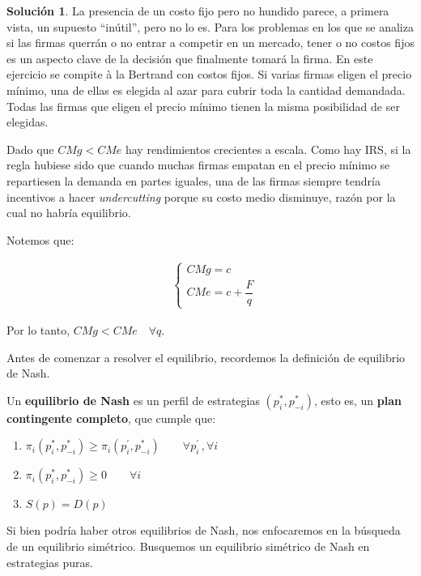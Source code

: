 \documentclass[a4paper, 11pt]{article}
\theoremstyle{definition}
\newtheorem{solucion}{Soluci\'on}
\begin{document}
\begin{solucion} %
La presencia de un costo fijo pero no hundido parece, a primera vista, un supuesto ``inútil'', pero no lo es. Para los problemas en los que se analiza si las firmas querrán o no entrar a competir en un mercado, tener o no costos fijos es un aspecto clave de la decisión que finalmente tomará la firma. En este ejercicio se compite à la Bertrand con costos fijos. Si varias firmas eligen el precio mínimo, una de ellas es elegida al azar para cubrir toda la cantidad demandada. Todas las firmas que eligen el precio mínimo tienen la misma posibilidad de ser elegidas.

Dado que $CMg < CMe$ hay rendimientos crecientes a escala. Como hay IRS, si la regla hubiese sido que cuando muchas firmas empatan en el precio mínimo se repartiesen la demanda en partes iguales, una de las firmas siempre tendría incentivos a hacer \textit{undercutting} porque su costo medio disminuye, razón por la cual no habría equilibrio.

Notemos que:
\vspace*{-28pt}

\begin{align*}
& \begin{cases}
CMg=c\\
CMe=c+\dfrac{F}{q}
\end{cases} 
\end{align*}

Por lo tanto, $CMg<CMe \quad \forall q$.

Antes de comenzar a resolver el equilibrio, recordemos la definición de equilibrio de Nash. 

\vspace{6pt}
Un \textbf{equilibrio de Nash} es un perfil de estrategias $(p_i^*, p_{-i}^*)$, esto es, un \color{red}\textbf{plan contingente completo}\color{black}, que cumple que:
\begin{enumerate}
\item $\pi_i(p_i^*, p_{-i}^*) \geq \pi_i(p_i^{'}, p_{-i}^*) \qquad \forall p_i^{'} \,, \forall i$
\item $\pi_i(p_i^*, p_{-i}^*) \geq 0 \qquad \forall i$
\item $S(p)=D(p)$
\end{enumerate}

 Si bien podría haber otros equilibrios de Nash, nos enfocaremos en la búsqueda de un equilibrio simétrico. Busquemos un equilibrio simétrico de Nash en estrategias puras.


\end{solucion}
\end{document}
